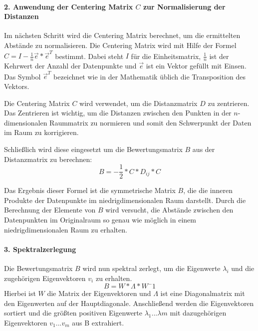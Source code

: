 \paragraph*{2. Anwendung der Centering Matrix $ C $ zur Normalisierung der
Distanzen}
Im nächsten Schritt wird die Centering Matrix berechnet, um die ermittelten Abstände zu normalisieren. Die Centering Matrix wird mit Hilfe der Formel $ C = I - \frac{1}{n} \vec{e} * \vec{e}^T $ bestimmt. Dabei steht $ I $ für die Einheitsmatrix, $ \frac{1}{n} $ ist der Kehrwert der Anzahl der Datenpunkte und $ \vec{e} $ ist ein Vektor gefüllt mit Einsen. Das Symbol $ \vec{e}^T $ bezeichnet wie in der Mathematik üblich die Transposition des Vektors. \parencite{wickelmaier_introduction_2003}

Die Centering Matrix $ C $ wird verwendet, um die Distanzmatrix $ D $ zu
zentrieren. Das Zentrieren ist wichtig, um die Distanzen zwischen den Punkten
in der $n$-dimensionalen Raummatrix zu normieren und somit den Schwerpunkt der
Daten im Raum zu korrigieren. \parencite{wickelmaier_introduction_2003}

Schließlich wird diese eingesetzt um die Bewertungsmatrix $ B $ aus der
Distanzmatrix zu berechnen:
$$ B = - \frac{1}{2} * C * D_{ij} * C $$

Das Ergebnis dieser Formel ist die symmetrische Matrix $ B $, die die \glqq inneren Produkte\grqq{} der Datenpunkte im niedrigdimensionalen Raum darstellt. \parencite{he_classical_2018} Durch die Berechnung der Elemente von $ B $ wird versucht, die Abstände zwischen den Datenpunkten im Originalraum so genau wie möglich in einem niedrigdimensionalen Raum zu erhalten.

\paragraph*{3. Spektralzerlegung}
Die Bewertungsmatrix $ B $ wird nun spektral zerlegt, um die Eigenwerte $ \lambda_{i} $ und die zugehörigen Eigenvektoren $ v_{i} $ zu erhalten. $$ B = W * \Lambda * W^-1 $$ Hierbei ist $ W $ die Matrix der Eigenvektoren und $ \Lambda $ ist eine Diagonalmatrix mit den Eigenwerten auf der Hauptdiagonale. Anschließend werden die Eigenvektoren sortiert und die größten positiven Eigenwerte $ \lambda_{1} ... \lambda{m} $ mit dazugehörigen Eigenvektoren $ v_{1} ... v_{m} $ aus B extrahiert. \parencite{wickelmaier_introduction_2003}

